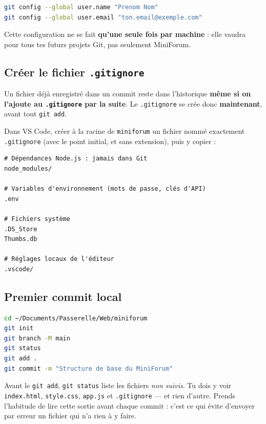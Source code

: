 \documentclass[a4paper,11pt]{article}
\begin{document}
\begin{lstlisting}[language=bash, numbers=none]
git config --global user.name "Prenom Nom"
git config --global user.email "ton.email@exemple.com"
\end{lstlisting}

\begin{tcolorbox}[astuce, title={Remarque}]
Cette configuration ne se fait \textbf{qu'une seule fois par machine} : elle vaudra pour tous tes futurs projets Git, pas seulement MiniForum.
\end{tcolorbox}

\subsection{Créer le fichier \texttt{.gitignore}}

\begin{tcolorbox}[attention, title={À faire avant le premier commit}]
Un fichier déjà enregistré dans un commit reste dans l'historique \textbf{même si on l'ajoute au \texttt{.gitignore} par la suite}. Le \texttt{.gitignore} se crée donc \textbf{maintenant}, avant tout \texttt{git add}.
\end{tcolorbox}

Dans VS Code, créer à la racine de \texttt{miniforum} un fichier nommé exactement \texttt{.gitignore} (avec le point initial, et sans extension), puis y copier :

\begin{lstlisting}[caption={\texttt{.gitignore}}]
# Dépendances Node.js : jamais dans Git
node_modules/

# Variables d'environnement (mots de passe, clés d'API)
.env

# Fichiers système
.DS_Store
Thumbs.db

# Réglages locaux de l'éditeur
.vscode/
\end{lstlisting}

\subsection{Premier commit local}

\begin{lstlisting}[language=bash, numbers=none]
cd ~/Documents/Passerelle/Web/miniforum
git init
git branch -M main
git status
git add .
git commit -m "Structure de base du MiniForum"
\end{lstlisting}

\begin{tcolorbox}[astuce, title={Lire la sortie de \texttt{git status}}]
Avant le \texttt{git add}, \texttt{git status} liste les fichiers \textit{non suivis}. Tu dois y voir \texttt{index.html}, \texttt{style.css}, \texttt{app.js} et \texttt{.gitignore} --- et rien d'autre. Prends l'habitude de lire cette sortie avant chaque commit : c'est ce qui évite d'envoyer par erreur un fichier qui n'a rien à y faire.
\end{tcolorbox}
\end{document}
